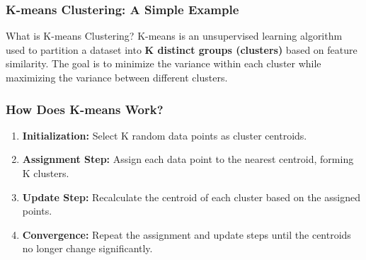 \documentclass[aspectratio=169]{beamer}
\begin{document}
\begin{frame}[fragile]
    \frametitle{K-means Clustering: A Simple Example}
    \begin{block}{What is K-means Clustering?}
        K-means is an unsupervised learning algorithm used to partition a dataset into \textbf{K distinct groups (clusters)} based on feature similarity. The goal is to minimize the variance within each cluster while maximizing the variance between different clusters.
    \end{block}
\end{frame}

\begin{frame}[fragile]
    \frametitle{How Does K-means Work?}
    \begin{enumerate}
        \item \textbf{Initialization:} Select K random data points as cluster centroids.
        \item \textbf{Assignment Step:} Assign each data point to the nearest centroid, forming K clusters.
        \item \textbf{Update Step:} Recalculate the centroid of each cluster based on the assigned points.
        \item \textbf{Convergence:} Repeat the assignment and update steps until the centroids no longer change significantly.
    \end{enumerate}
\end{frame}
\end{document}
